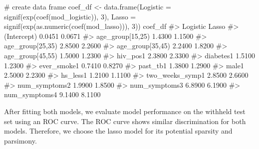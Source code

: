 \documentclass[
  letterpaper,
]{latex/krantz}
\makeatletter
\newenvironment{Shaded}{\begin{snugshade}}{\end{snugshade}}
\newcommand{\AttributeTok}[1]{\textcolor[rgb]{0.40,0.45,0.13}{#1}}
\newcommand{\CommentTok}[1]{\textcolor[rgb]{0.37,0.37,0.37}{#1}}
\newcommand{\DecValTok}[1]{\textcolor[rgb]{0.68,0.00,0.00}{#1}}
\newcommand{\FunctionTok}[1]{\textcolor[rgb]{0.28,0.35,0.67}{#1}}
\newcommand{\NormalTok}[1]{\textcolor[rgb]{0.00,0.23,0.31}{#1}}
\newcommand{\OtherTok}[1]{\textcolor[rgb]{0.00,0.23,0.31}{#1}}
\newenvironment{kframe}{%
\medskip{}
\setlength{\fboxsep}{.8em}
 \def\at@end@of@kframe{}%
 \ifinner\ifhmode%
  \def\at@end@of@kframe{\end{minipage}}%
  \begin{minipage}{\columnwidth}%
 \fi\fi%
 \def\FrameCommand##1{\hskip\@totalleftmargin \hskip-\fboxsep
 \colorbox{shadecolor}{##1}\hskip-\fboxsep
     \hskip-\linewidth \hskip-\@totalleftmargin \hskip\columnwidth}%
 \MakeFramed {\advance\hsize-\width
   \@totalleftmargin\z@ \linewidth\hsize
   \@setminipage}}%
 {\par\unskip\endMakeFramed%
 \at@end@of@kframe}
\renewenvironment{Shaded}{\begin{kframe}}{\end{kframe}}
\makeatother
\begin{document}
\begin{Shaded}
\begin{Highlighting}[]
\CommentTok{\# create data frame}
\NormalTok{coef\_df }\OtherTok{\textless{}{-}} \FunctionTok{data.frame}\NormalTok{(}\AttributeTok{Logistic =} \FunctionTok{signif}\NormalTok{(}\FunctionTok{exp}\NormalTok{(}\FunctionTok{coef}\NormalTok{(mod\_logistic)), }\DecValTok{3}\NormalTok{),}
                      \AttributeTok{Lasso =} 
                        \FunctionTok{signif}\NormalTok{(}\FunctionTok{exp}\NormalTok{(}\FunctionTok{as.numeric}\NormalTok{(}\FunctionTok{coef}\NormalTok{(mod\_lasso))), }\DecValTok{3}\NormalTok{))}
\NormalTok{coef\_df}
\CommentTok{\#\textgreater{}                  Logistic  Lasso}
\CommentTok{\#\textgreater{} (Intercept)        0.0451 0.0671}
\CommentTok{\#\textgreater{} age\_group[15,25)   1.4300 1.1500}
\CommentTok{\#\textgreater{} age\_group[25,35)   2.8500 2.2600}
\CommentTok{\#\textgreater{} age\_group[35,45)   2.2400 1.8200}
\CommentTok{\#\textgreater{} age\_group[45,55)   1.5000 1.2300}
\CommentTok{\#\textgreater{} hiv\_pos1           2.3800 2.3300}
\CommentTok{\#\textgreater{} diabetes1          1.5100 1.2300}
\CommentTok{\#\textgreater{} ever\_smoke1        0.7410 0.8270}
\CommentTok{\#\textgreater{} past\_tb1           1.3800 1.2900}
\CommentTok{\#\textgreater{} male1              2.5000 2.2300}
\CommentTok{\#\textgreater{} hs\_less1           1.2100 1.1100}
\CommentTok{\#\textgreater{} two\_weeks\_symp1    2.8500 2.6600}
\CommentTok{\#\textgreater{} num\_symptoms2      1.9900 1.8500}
\CommentTok{\#\textgreater{} num\_symptoms3      6.8900 6.1900}
\CommentTok{\#\textgreater{} num\_symptoms4      9.1400 8.1100}
\end{Highlighting}
\end{Shaded}

After fitting both models, we evaluate model performance on the withheld
test set using an ROC curve. The ROC curve shows similar discrimination
for both models. Therefore, we choose the lasso model for its potential
sparsity and parsimony.
\end{document}
